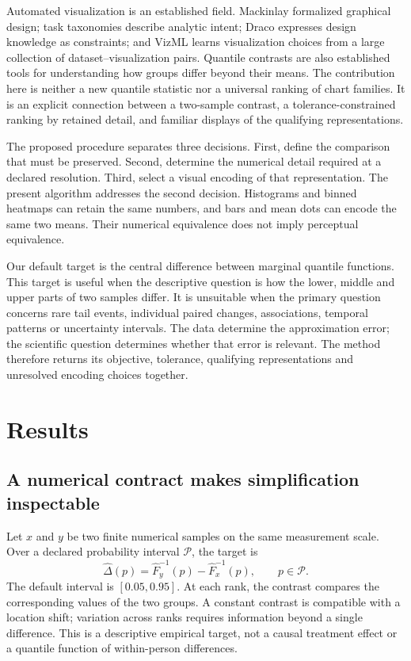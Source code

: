 \documentclass[11pt]{article}
\begin{document}
Automated visualization is an established field. Mackinlay formalized graphical design; task taxonomies describe analytic intent; Draco expresses design knowledge as constraints; and VizML learns visualization choices from a large collection of dataset--visualization pairs.\cite{mackinlay1986,amar2005,draco,vizml} Quantile contrasts are also established tools for understanding how groups differ beyond their means.\cite{rousselet2017} The contribution here is neither a new quantile statistic nor a universal ranking of chart families. It is an explicit connection between a two-sample contrast, a tolerance-constrained ranking by retained detail, and familiar displays of the qualifying representations.

The proposed procedure separates three decisions. First, define the comparison that must be preserved. Second, determine the numerical detail required at a declared resolution. Third, select a visual encoding of that representation. The present algorithm addresses the second decision. Histograms and binned heatmaps can retain the same numbers, and bars and mean dots can encode the same two means. Their numerical equivalence does not imply perceptual equivalence.\cite{cleveland1984}

Our default target is the central difference between marginal quantile functions. This target is useful when the descriptive question is how the lower, middle and upper parts of two samples differ. It is unsuitable when the primary question concerns rare tail events, individual paired changes, associations, temporal patterns or uncertainty intervals. The data determine the approximation error; the scientific question determines whether that error is relevant. The method therefore returns its objective, tolerance, qualifying representations and unresolved encoding choices together.

\section*{Results}
\subsection*{A numerical contract makes simplification inspectable}
Let $x$ and $y$ be two finite numerical samples on the same measurement scale. Over a declared probability interval $\mathcal P$, the target is
\begin{equation}\label{eq:target}
\widehat\Delta(p)=\widehat F_y^{-1}(p)-\widehat F_x^{-1}(p),\qquad p\in\mathcal P.
\end{equation}
The default interval is $[0.05,0.95]$. At each rank, the contrast compares the corresponding values of the two groups. A constant contrast is compatible with a location shift; variation across ranks requires information beyond a single difference. This is a descriptive empirical target, not a causal treatment effect or a quantile function of within-person differences.
\end{document}

